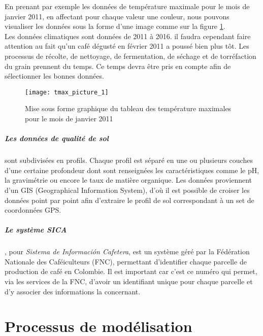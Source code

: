 En prenant par exemple les données de température maximale pour le mois de janvier 2011, en affectant pour chaque valeur une couleur, nous pouvons visualiser les données sous la forme d'une image comme sur la figure \ref{tmax_picture}.\\

Les données climatiques sont données de 2011 à 2016. il faudra cependant faire attention au fait qu'un café dégusté en février 2011 a poussé bien plus tôt. Les processus de récolte, de nettoyage, de fermentation, de séchage et de torréfaction du grain prennent du temps. Ce temps devra être pris en compte afin de sélectionner les bonnes données. 


\begin{figure}[H]
	\texttt{[image: tmax\_picture\_1]}
	\caption{\label{tmax_picture} Mise sous forme graphique du tableau des température maximales pour le mois de janvier 2011 }
\end{figure}

\paragraph{Les données de qualité de sol}sont subdivisées en profils. Chaque profil est séparé en une ou plusieurs couches d’une certaine profondeur dont sont renseignées les caractéristiques comme le pH, la gravimétrie ou encore le taux de matière organique. Les données proviennent d'un GIS (Geographical Information System), d'où il est possible de croiser les données point par point afin d'extraire le profil de sol correspondant à un set de coordonnées GPS. 

\paragraph{Le système SICA}, pour \textit{Sistema de Información Cafetera}, est un système géré par la Fédération Nationale des Caféiculteurs (FNC), permettant d'identifier chaque parcelle de production de café en Colombie\cite{SICA}. Il est important car c'est ce numéro qui permet, via les services de la FNC, d'avoir un identifiant unique pour chaque parcelle et d'y associer des informations la concernant.  


\chapter{Processus de modélisation}

